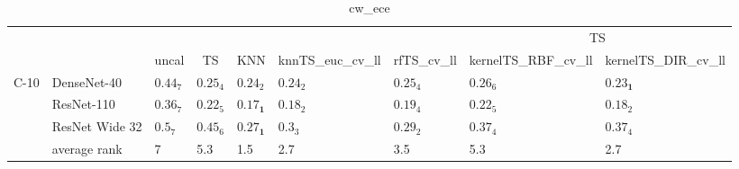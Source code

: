 \begin{table*}
\caption{cw_ece}
\label{table:cw_ece}
\centering
\begin{adjustbox}{width=\textwidth}

\begin{tabular}{lllllllll}
\toprule
\multicolumn{7}{c}{}&\multicolumn{2}{c}{TS}\\
\cmidrule{8-9}
\multicolumn{1}{c}{}&\multicolumn{1}{c}{}&\multicolumn{1}{c}{uncal}&\multicolumn{1}{c}{TS}&\multicolumn{1}{c}{KNN}&\multicolumn{1}{c}{knnTS_euc_cv_ll}&\multicolumn{1}{c}{rfTS_cv_ll}&\multicolumn{1}{c}{kernelTS_RBF_cv_ll}&\multicolumn{1}{c}{kernelTS_DIR_cv_ll}\\\midrule
C-10 & DenseNet-40 &  $0.44_{7}$ &  $0.25_{4}$ &           $0.24_{2}$ &      $0.24_{2}$ &  $0.25_{4}$ &         $0.26_{6}$ &  $\mathbf{0.23_{1}}$ \\
     & ResNet-110 &  $0.36_{7}$ &  $0.22_{5}$ &  $\mathbf{0.17_{1}}$ &      $0.18_{2}$ &  $0.19_{4}$ &         $0.22_{5}$ &           $0.18_{2}$ \\
     & ResNet Wide 32 &   $0.5_{7}$ &  $0.45_{6}$ &  $\mathbf{0.27_{1}}$ &       $0.3_{3}$ &  $0.29_{2}$ &         $0.37_{4}$ &           $0.37_{4}$ \\
\cmidrule{2-9}
     & average rank &           7 &         5.3 &                  1.5 &             2.7 &         3.5 &                5.3 &                  2.7 \\
\cmidrule{1-9}
\bottomrule
\end{tabular}


\end{adjustbox}
\end{table*}
